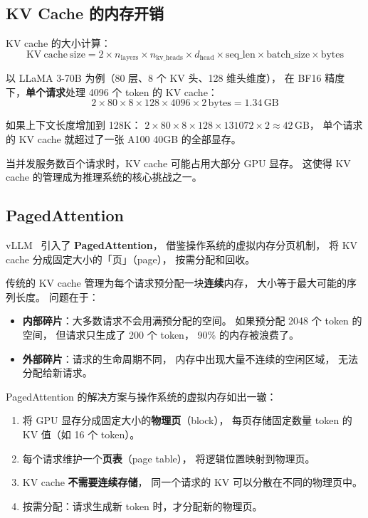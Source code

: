 \subsection{KV Cache 的内存开销}

KV cache 的大小计算：
\begin{equation}
  \mathrm{KV\ cache\ size} = 2 \times n_{\mathrm{layers}}
  \times n_{\mathrm{kv\_heads}} \times d_{\mathrm{head}}
  \times \mathrm{seq\_len} \times \mathrm{batch\_size}
  \times \mathrm{bytes}
\end{equation}

以 LLaMA 3-70B 为例（80 层、8 个 KV 头、128 维头维度），
在 BF16 精度下，\textbf{单个请求}处理 4096 个 token 的 KV cache：
\begin{equation}
  2 \times 80 \times 8 \times 128 \times 4096 \times 2\,\text{bytes}
  = 1.34\,\text{GB}
\end{equation}

如果上下文长度增加到 128K：
$2 \times 80 \times 8 \times 128 \times 131072 \times 2 \approx 42\,\text{GB}$，
单个请求的 KV cache 就超过了一张 A100 40GB 的全部显存。

当并发服务数百个请求时，KV cache 可能占用大部分 GPU 显存。
这使得 KV cache 的管理成为推理系统的核心挑战之一。

\subsection{PagedAttention}

vLLM~\cite{kwon2023vllm} 引入了 \textbf{PagedAttention}，
借鉴操作系统的虚拟内存分页机制，
将 KV cache 分成固定大小的「页」（page），
按需分配和回收。

传统的 KV cache 管理为每个请求预分配一块\textbf{连续}内存，
大小等于最大可能的序列长度。
问题在于：
\begin{itemize}[noitemsep]
  \item \textbf{内部碎片}：大多数请求不会用满预分配的空间。
        如果预分配 2048 个 token 的空间，
        但请求只生成了 200 个 token，
        90\% 的内存被浪费了。
  \item \textbf{外部碎片}：请求的生命周期不同，
        内存中出现大量不连续的空闲区域，
        无法分配给新请求。
\end{itemize}

PagedAttention 的解决方案与操作系统的虚拟内存如出一辙：
\begin{enumerate}[noitemsep]
  \item 将 GPU 显存分成固定大小的\textbf{物理页}（block），
        每页存储固定数量 token 的 KV 值（如 16 个 token）。
  \item 每个请求维护一个\textbf{页表}（page table），
        将逻辑位置映射到物理页。
  \item KV cache \textbf{不需要连续存储}，
        同一个请求的 KV 可以分散在不同的物理页中。
  \item 按需分配：请求生成新 token 时，才分配新的物理页。
\end{enumerate}


